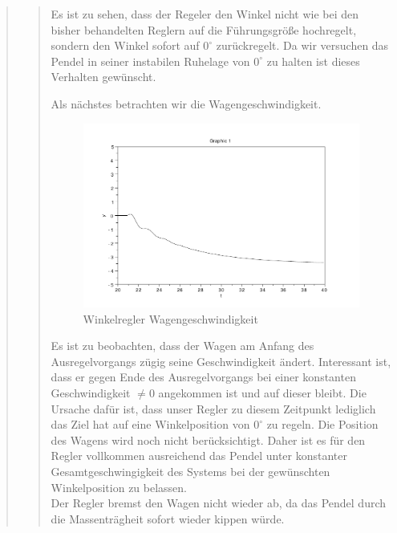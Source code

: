 \begin{quote}
\begin{quote}
        Es ist zu sehen, dass der Regeler den Winkel nicht wie bei den bisher behandelten Reglern auf die Führungsgröße
        hochregelt, sondern den Winkel sofort auf $0^{\circ}$ zurückregelt. Da wir versuchen das Pendel in seiner
        instabilen Ruhelage von $0^{\circ}$ zu halten ist dieses Verhalten gewünscht.\vspace{1em}
        
        Als nächstes betrachten wir die Wagengeschwindigkeit.
        
        \begin{figure}[H]
        \centering
            \includegraphics[scale=0.7, trim = 0cm 0cm 0cm 0cm, clip]{./Bilder/Winkelregler_Wagengeschwindigkeit}
                \caption{Winkelregler Wagengeschwindigkeit}
        \end{figure}
        
        Es ist zu beobachten, dass der Wagen am Anfang des Ausregelvorgangs zügig seine Geschwindigkeit ändert. Interessant
        ist, dass er gegen Ende des Ausregelvorgangs bei einer konstanten Geschwindigkeit $\neq 0$ angekommen ist und
        auf dieser bleibt. Die Ursache dafür ist, dass unser Regler zu diesem Zeitpunkt lediglich das Ziel hat auf eine
        Winkelposition von $0^{\circ}$ zu regeln. Die Position des Wagens wird noch nicht berücksichtigt. Daher ist es
        für den Regler vollkommen ausreichend das Pendel unter konstanter Gesamtgeschwingigkeit des Systems bei der
        gewünschten Winkelposition zu belassen.\\
        Der Regler bremst den Wagen nicht wieder ab, da das Pendel durch die Massenträgheit sofort wieder kippen würde.
        \vspace{1em}
        

\end{quote}
\end{quote}
